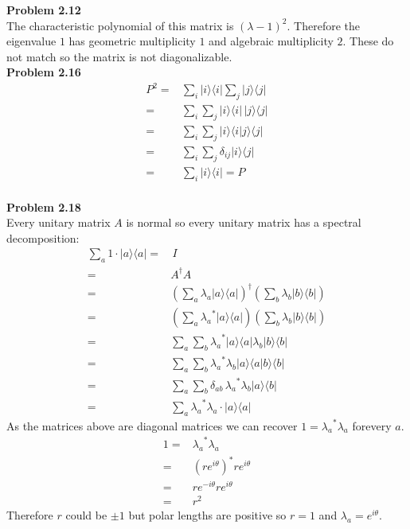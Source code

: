 \documentclass[fleqn]{article}
\newcommand{\problem}[1]{\large\textbf{Problem #1}\normalsize}
\newcommand{\bra}[1]{\ensuremath{\langle #1 |}}
\newcommand{\ket}[1]{\ensuremath{| #1 \rangle}}
\newcommand{\innerF}[2]{\ensuremath{\langle #1 | #2 \rangle}}
\newcommand{\outerF}[2]{\ket{#1} \bra{#2}}
\begin{document}
\problem{2.12} \\
The characteristic polynomial of this matrix is $(\lambda - 1)^2$. Therefore the
eigenvalue $1$ has geometric multiplicity $1$ and algebraic multiplicity $2$.
These do not match so the matrix is not diagonalizable. \\

\problem{2.16} 
\begin{align*}
  P^2 =& \sum_{i} \outerF{i}{i} \sum_{j} \outerF{j}{j} \\
      =& \sum_{i} \sum_{j} \outerF{i}{i} \, \outerF{j}{j} \\
      =& \sum_{i} \sum_{j} \ket{i} \innerF{i}{j} \bra{j} \\
      =& \sum_{i} \sum_{j} \delta_{i j} \outerF{i}{j} \\
      =& \sum_{i} \outerF{i}{i} = P \\
\end{align*}

\problem{2.18} \\
Every unitary matrix $A$ is normal so every unitary matrix has a spectral
decomposition:
\begin{align*}
  \sum_{a} 1 \cdot \outerF{a}{a} =& \, I \\
  =& A^{\dagger} A \\
  =& {\left(\sum_{a} \lambda_{a} \outerF{a}{a}\right)}^{\dagger} \left(\sum_{b} \lambda_{b} \outerF{b}{b}\right) \\
  =& \left(\sum_{a} {\lambda_{a}}^* \outerF{a}{a}\right) \left(\sum_{b} \lambda_{b} \outerF{b}{b}\right) \\
  =& \sum_{a} \sum_{b} {\lambda_{a}}^* \outerF{a}{a} \lambda_{b} \outerF{b}{b} \\
  =& \sum_{a} \sum_{b} {\lambda_{a}}^* \lambda_{b} \ket{a} \innerF{a}{b} \bra{b} \\
  =& \sum_{a} \sum_{b} \delta_{a b} \, {\lambda_{a}}^* \lambda_{b} \outerF{a}{b} \\
  =& \sum_{a}  {\lambda_{a}}^* \lambda_{a} \cdot \outerF{a}{a}
\end{align*}
As the matrices above are diagonal matrices we can recover $1 = {\lambda_{a}}^* \lambda_{a}$ forevery $a$.
\begin{align*}
  1 =& {\lambda_{a}}^* \lambda_{a} \\
    =& {\left( r e^{i \theta} \right)}^* r e^{i \theta} \\
    =& r e^{-i \theta} r e^{i \theta} \\
    =& r^2
\end{align*}
Therefore $r$ could be $\pm 1$ but polar lengths are positive so $r = 1$ and
$\lambda_{a} = e^{i\theta}$. \\
\end{document}

